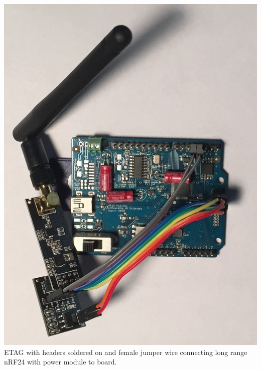 \documentclass[12pt]{article}
\begin{document}
\begin{center}
\includegraphics[width=6in,angle=180]{ETAG_Assembled}\\
ETAG with headers soldered on and female jumper wire connecting long range nRF24 with power module to board.
\end{center}
\end{document}
